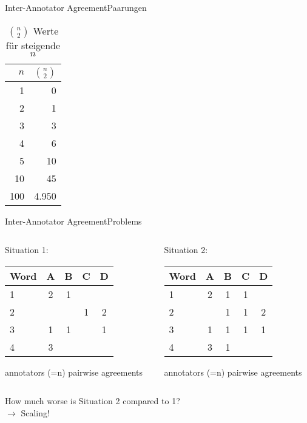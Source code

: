 \documentclass[aspectratio=169]{beamer}
\begin{document}
\begin{frame}{Inter-Annotator Agreement}{Paarungen}
\begin{table}
\begin{tabular}{rr}
\toprule
$n$ & ${n\choose 2}$ \\
\midrule
1 & 0 \\
2 & 1 \\
3 & 3 \\
4 & 6 \\
5 & 10 \\
10 & 45 \\
100 & 4.950 \\
\bottomrule
\end{tabular}
\caption{$n\choose 2$ Werte für steigende $n$}
\end{table}
\end{frame}

\begin{frame}{Inter-Annotator Agreement}{Problems}
\begin{columns}[T]
\begin{column}{.45\paperwidth}
Situation 1:

\begin{tabular}{lcccc}
\toprule
Word & A & B & C & D \\
\midrule
1 & 2 & 1 &   &   \\
2 &   &   & 1 & 2 \\
3 & 1 & 1 &   & 1 \\
4 & 3 &   &   &   \\
\bottomrule
\end{tabular}
\begin{outline}
 annotators (=n)
 pairwise agreements
\end{outline}
\end{column}

\pause

\begin{column}{.45\paperwidth}
Situation 2:

\begin{tabular}{lcccc}
\toprule
Word & A & B & C & D \\
\midrule
1 & 2 & 1 & 1 &   \\
2 &   & 1 & 1 & 2 \\
3 & 1 & 1 & 1 & 1 \\
4 & 3 & 1 &   &   \\
\bottomrule
\end{tabular}
\begin{outline}
 annotators (=n)
 pairwise agreements
\end{outline}
\end{column}
\end{columns}
\pause
\vspace{2em}
How much worse is Situation 2 compared to 1?\\
$\rightarrow$ Scaling!
\end{frame}
\end{document}
